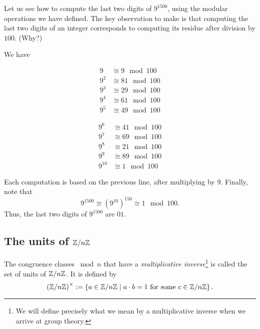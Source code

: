 \documentclass[11pt,a4paper]{article}
\begin{document}
Let us see how to compute the last two digits of \(9^{1500}\), using the modular operations we have defined.
The key observation to make is that computing the last two digits of an integer corresponds to computing its residue   after division by \(100\).
(Why?)

We have  
\vspace{-\baselineskip}
\begin{center}
    \begin{minipage}{0.3\linewidth}
        \begin{align*}
            9 &\cong 9 \mod 100\\
            9^2 &\cong 81 \mod 100\\
            9^3 &\cong 29 \mod 100\\
            9^4 &\cong 61 \mod 100\\
            9^5 &\cong 49 \mod 100
        \end{align*}
        \end{minipage}
        \begin{minipage}{0.3\linewidth}
        \begin{align*}
            9^6 &\cong 41 \mod 100\\
            9^7 &\cong 69 \mod 100\\
            9^8 &\cong 21 \mod 100\\
            9^9 &\cong 89 \mod 100\\
            9^{10} &\cong 1 \mod 100
        \end{align*}
    \end{minipage}
\end{center}
    

Each computation is based on the previous line, after  multiplying by \(9\).
Finally, note that \[9^{1500} \cong (9^{10})^{150} \cong 1\mod 100.\]
Thus, the last two digits of \(9^{1500}\) are \(01\).


\subsection{The units of \(\mathbb{Z}/n \mathbb{Z}\)}

The congruence classes \(\bmod n\) that have a \textit{multiplicative inverse}\footnote{We will define precisely what we mean by a multiplicative inverse when we arrive at group theory.} is called the set of units of \(\mathbb{Z}/n \mathbb{Z}\). It is defined by 
\[\left( \mathbb{Z}/n \mathbb{Z} \right)^\times := \left\{ a\in  \mathbb{Z}/n \mathbb{Z} \mid a\cdot b = 1 \text{ for some } c\in \mathbb{Z}/n \mathbb{Z} \right\}.\]
\end{document}
